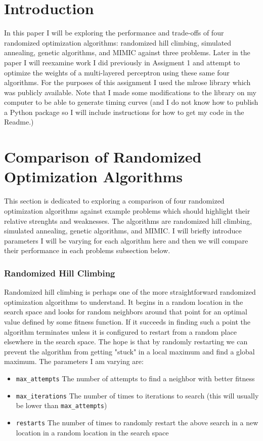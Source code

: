 \documentclass[11pt]{article}
\begin{document}
    \thispagestyle{firstpage}


    \section{Introduction}
    In this paper I will be exploring the performance and trade-offs of four randomized optimization algorithms: randomized hill climbing,
    simulated annealing, genetic algorithms, and MIMIC against three problems.
    Later in the paper I will reexamine work I did previously in Assigment 1 and attempt to optimize the weights of a multi-layered perceptron using these same
    four algorithms.
    For the purposes of this assignment I used the mlrose library\cite{Hayes19} which was publicly available.
    Note that I made some modifications to the library on my computer to be able to generate timing curves (and I do not
    know how to publish a Python package so I will include instructions for how to get my code in the Readme.)


    \section{Comparison of Randomized Optimization Algorithms}
    This section is dedicated to exploring a comparison of four randomized optimization algorithms against example problems
    which should highlight their relative strenghts and weaknesses.
    The algorithms are randomized hill climbing, simulated annealing, genetic algorithms, and MIMIC.
    I will briefly introduce parameters I will be varying for each algorithm here and then we will compare their performance
    in each problems subsection below.
    \subsubsection*{Randomized Hill Climbing}
    Randomized hill climbing is perhaps one of the more straightforward randomized optimization algorithms to understand.
    It begins in a random location in the search space and looks for random neighbors around that point for an optimal value defined
    by some fitness function.
    If it succeeds in finding such a point the algorithm terminates unless it is configured to restart from a random place elsewhere in the search space.
    The hope is that by randomly restarting we can prevent the algorithm from getting "stuck" in a local maximum and find a global maximum.
    The parameters I am varying are:
    \begin{itemize}
        \item \texttt{max\_attempts} The number of attempts to find a neighbor with better fitness
        \item \texttt{max\_iterations} The number of times to iterations to search (this will usually be lower than \texttt{max\_attempts})
        \item \texttt{restarts} The number of times to randomly restart the above search in a new location in a random location in the search space
    \end{itemize}
\end{document}
